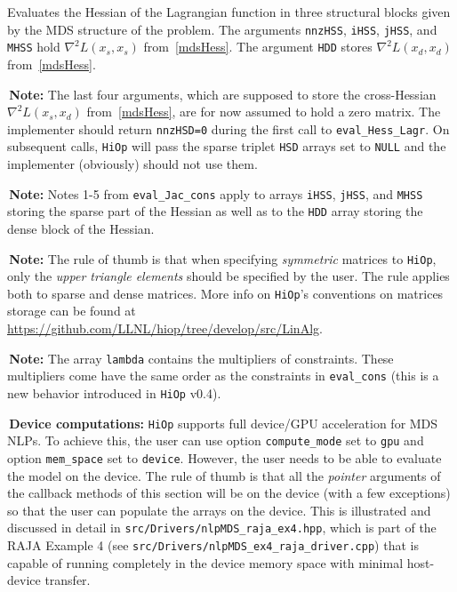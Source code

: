 \documentclass[11pt]{article}
\newcommand{\warningSymbol}{\raisebox{0.9\depth}{\danger}}
\newcommand{\warningcp}[1]{%
        \smallskip \noindent \textcolor{warningColorText}{\warningSymbol{}}\,\textbf{#1} %
    }
\newcommand{\Hi}{\texttt{HiOp}\xspace}
\begin{document}
\noindent Evaluates the Hessian of the Lagrangian function in three structural blocks given by the MDS structure of the problem. The arguments \texttt{nnzHSS}, \texttt{iHSS}, \texttt{jHSS}, and \texttt{MHSS} hold  $\nabla^2 L(x_s,x_s)$ from~\eqref{mdsHess}. The argument \texttt{HDD} stores $\nabla^2 L(x_d,x_d)$ from~\eqref{mdsHess}. 


\warningcp{Note:} The last four arguments, which are supposed to store the cross-Hessian $\nabla^2 L(x_s,x_d)$ from~\eqref{mdsHess}, are for now assumed to hold a zero matrix. The implementer should return \texttt{nnzHSD=0} during the first call to \texttt{eval\_Hess\_Lagr}. On subsequent calls, \Hi will pass the sparse triplet \texttt{HSD} arrays   set to \texttt{NULL} and the implementer (obviously) should not use them.
 
 
\warningcp{Note:} Notes 1-5 from \texttt{eval\_Jac\_cons} apply to arrays \texttt{iHSS}, \texttt{jHSS}, and \texttt{MHSS} storing the sparse part of the Hessian as well as to the \texttt{HDD} array storing the dense block of the Hessian. 

\warningcp{Note:} The rule of thumb is that when specifying \textit{symmetric} matrices to \Hi, only the \textit{upper triangle elements} should be specified by the user. The rule applies both to sparse and dense matrices. More info on \Hi's conventions on matrices storage can be found at \url{https://github.com/LLNL/hiop/tree/develop/src/LinAlg}.


\warningcp{Note:} The array \texttt{lambda} contains  the multipliers of constraints. These multipliers come have the same order as the constraints in \texttt{eval\_cons} (this is a new behavior introduced in \Hi v0.4).

\warningcp{Device computations:} \Hi supports full device/GPU acceleration for MDS NLPs. To achieve this, the user can use option \texttt{compute\_mode} set to \texttt{gpu} and option \texttt{mem\_space} set to \texttt{device}. However, the user needs to be able to evaluate the model on the device. The rule of thumb is that all the \textit{pointer} arguments of the callback methods of this section will be on the device (with a few exceptions) so that the user can populate the arrays on the device. This is illustrated and discussed in detail in \texttt{src/Drivers/nlpMDS\_raja\_ex4.hpp}, which is part of the RAJA Example 4 (see \texttt{src/Drivers/nlpMDS\_ex4\_raja\_driver.cpp}) that is capable of running completely in the device memory space with minimal host-device transfer.
\end{document}
